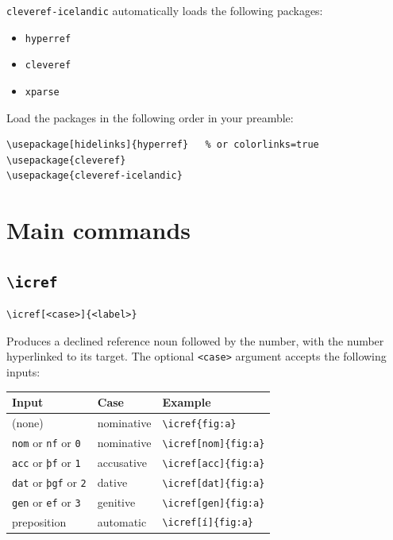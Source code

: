 \documentclass{article}
\begin{document}
\texttt{cleveref-icelandic} automatically loads the following packages:

\begin{itemize}
  \item \texttt{hyperref}
  \item \texttt{cleveref}
  \item \texttt{xparse}
\end{itemize}

Load the packages in the following order in your preamble:

\begin{lstlisting}
\usepackage[hidelinks]{hyperref}   % or colorlinks=true
\usepackage{cleveref}
\usepackage{cleveref-icelandic}
\end{lstlisting}

\section{Main commands}

\subsection{\texttt{\textbackslash icref}}

\begin{lstlisting}
\icref[<case>]{<label>}
\end{lstlisting}

Produces a declined reference noun followed by the number, with the
number hyperlinked to its target. The optional \texttt{<case>} argument
accepts the following inputs:

\begin{center}
\begin{tabular}{lll}
  \toprule
  Input & Case & Example \\
  \midrule
  (none)                                       & nominative & \verb|\icref{fig:a}| \\
  \texttt{nom} or \texttt{nf} or \texttt{0}  & nominative & \verb|\icref[nom]{fig:a}| \\
  \texttt{acc} or \texttt{þf} or \texttt{1}  & accusative & \verb|\icref[acc]{fig:a}| \\
  \texttt{dat} or \texttt{þgf} or \texttt{2}  & dative     & \verb|\icref[dat]{fig:a}| \\
  \texttt{gen} or \texttt{ef} or \texttt{3}  & genitive   & \verb|\icref[gen]{fig:a}| \\
  preposition                                  & automatic  & \verb|\icref[í]{fig:a}| \\
  \bottomrule
\end{tabular}
\end{center}
\end{document}
